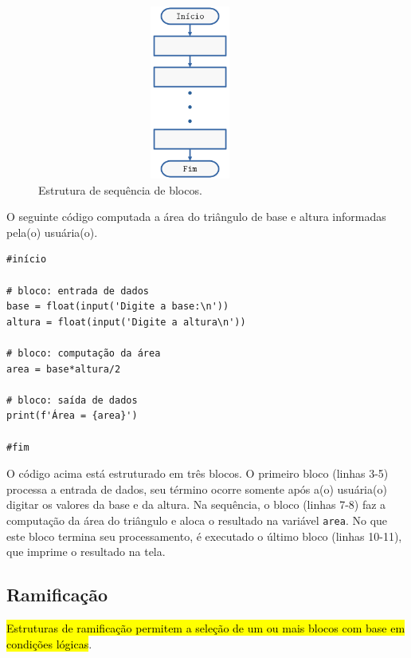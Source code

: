 \begin{figure}[H]
  \centering
  \includegraphics[max width=0.9\textwidth, max height=2.25in]{./cap_progest/dados/fig_fg_sequencia/fig.png}
  \caption{Estrutura de sequência de blocos.}
  \label{cap_progest:fig:fg_sequencia}
\end{figure}

\begin{ex}
  O seguinte código computada a área do triângulo de base e altura informadas pela(o) usuária(o).

\begin{lstlisting}
#início

# bloco: entrada de dados
base = float(input('Digite a base:\n'))
altura = float(input('Digite a altura\n'))

# bloco: computação da área
area = base*altura/2

# bloco: saída de dados
print(f'Área = {area}')

#fim
\end{lstlisting}

O código acima está estruturado em três blocos. O primeiro bloco (linhas 3-5) processa a entrada de dados, seu término ocorre somente após a(o) usuária(o) digitar os valores da base e da altura. Na sequência, o bloco (linhas 7-8) faz a computação da área do triângulo e aloca o resultado na variável \lstinline+area+. No que este bloco termina seu processamento, é executado o último bloco (linhas 10-11), que imprime o resultado na tela.
\end{ex}

\subsection{Ramificação}

\hl{Estruturas de ramificação permitem a seleção de um ou mais blocos com base em condições lógicas}.

